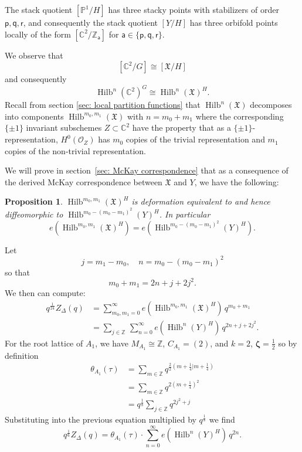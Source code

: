 \documentclass{amsart}
\newtheorem{proposition}[theorem]{Proposition}
\theoremstyle{definition}
\newcommand{\CC} {{\mathbb C}}          %
\newcommand{\ZZ} {{\mathbb Z}}		%
\newcommand{\PP}{\mathbb{P}}
\newcommand{\X}{\mathfrak{X}}
\renewcommand{\O}{\mathcal{O}}
\newcommand{\varp}{\mathsf{p}}
\newcommand{\varq}{\mathsf{q}}
\newcommand{\varr}{\mathsf{r}}
\newcommand{\vara}{\mathsf{a}}
\newcommand{\zetavec}{\bm{\zeta }}
\newcommand{\Hilb}{\operatorname{Hilb}}
\begin{document}
The stack quotient $[\PP^{1}/H]$ has three stacky points with
stabilizers of order $\varp ,\varq ,\varr$, and consequently the stack
quotient $[Y/H]$ has three orbifold points locally of the form
$[\CC^{2}/\ZZ_{\vara }]$ for $\vara \in \{\varp ,\varq ,\varr \}$.


We observe that 
\[
 [\CC^{2}/G ] \cong [\X /H ]
\]
and consequently
\[
\Hilb^{n}(\CC^{2})^{G}  \cong \Hilb^{n}(\X )^{H} .
\]
Recall from section \ref{sec: local partition functions} that $
\Hilb^{n}(\X )$ decomposes into components $\Hilb^{m_{0},m_{1}}(\X )$
with $n=m_{0}+m_{1}$ where the corresponding $\{\pm 1 \}$ invariant
subschemes $Z\subset \CC^{2}$ have the property that as a $\{\pm 1
\}$-representation, $H^{0}(\O_{Z})$ has $m_{0}$ copies of the trivial
representation and $m_{1}$ copies of the non-trivial representation.

We will prove in section~\ref{sec: McKay correspondence} that as a
consequence of the derived McKay correspondence between $\X$ and $Y$,
we have the following:
\begin{proposition}\label{prop: Hilb(X,m0,m1) = Hilb(Y,m0-(m0-m1)^2)}
$\Hilb^{m_{0},m_{1}}(\X )^{H}$ is deformation equivalent to and hence
diffeomorphic to $\Hilb^{m_{0}-(m_{0}-m_{1})^{2}}(Y)^{H}$. In
particular
\[
e\left(\Hilb^{m_{0},m_{1}}(\X )^{H} \right)
=e\left(\Hilb^{m_{0}-(m_{0}-m_{1})^{2}}(Y)^{H} \right). 
\]
\end{proposition}

Let
\[
j=m_{1}-m_{0}, \quad n=m_{0}-(m_{0}-m_{1})^{2} 
\]
so that
\[
m_{0}+m_{1} = 2n +j + 2j^{2}. 
\]
We then can compute:
\begin{align*}
q^{\frac{1}{24}} Z_{\Delta}(q) &= \sum_{m_{0},m_{1}= 0}^{\infty } 
e\left(\Hilb^{m_{0},m_{1}}(\X )^{H} \right) \, q^{m_{0}+m_{1}} \\
&= \sum_{j\in \ZZ}\,  \sum_{n=0}^{\infty} e\left(\Hilb^{n}(Y)^{H}
\right)\, q^{2n+j+2j^{2}}.
\end{align*}
For the root lattice of $A_{1}$, we have $M_{A_{1}}\cong \ZZ$,  $C_{A_{1}}=(2)$, and $k=2$,
$\zetavec =\frac{1}{2}$ so by definition
\begin{align*}
\theta_{A_{1}}(\tau ) &= \sum_{m\in \ZZ}
q^{\frac{2}{2}\left(m+\frac{1}{4}|m+\frac{1}{4} \right)} \\
&=\sum_{m\in \ZZ} q^{2(m+\frac{1}{4})^{2}} \\
&=q^{\frac{1}{8}} \sum_{j\in \ZZ} q^{2j^{2}+j}
\end{align*}
Substituting into the previous equation multiplied by
$q^{\frac{1}{8}}$ we find
\[
q^{\frac{1}{6}} Z_{\Delta}(q) = \theta_{A_{1}}(\tau ) \cdot
\sum_{n=0}^{\infty}  e\left(\Hilb^{n}(Y)^{H}
\right)\, q^{2n}.
\]
\end{document}
